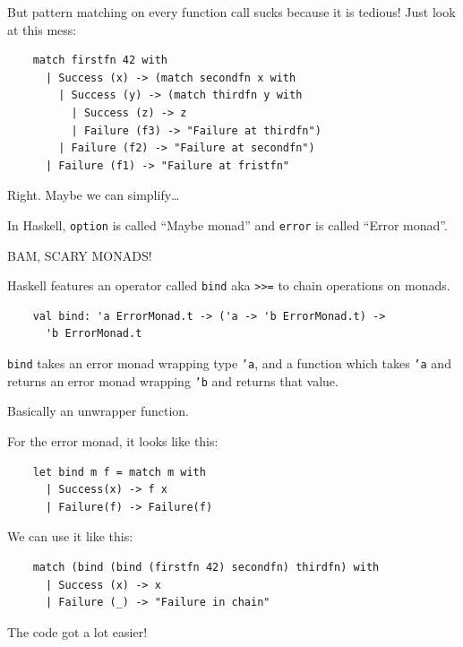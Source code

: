 \documentclass{beamer}
\renewcommand{\example}[1]{{\usebeamercolor[fg]{example text} #1}}
\begin{document}
\begin{frame}[fragile]
  But pattern matching on every function call sucks because it is
  \alert{tedious}! Just look at this mess:
  \begin{verbatim}
    match firstfn 42 with 
      | Success (x) -> (match secondfn x with
        | Success (y) -> (match thirdfn y with
          | Success (z) -> z
          | Failure (f3) -> "Failure at thirdfn")
        | Failure (f2) -> "Failure at secondfn")
      | Failure (f1) -> "Failure at fristfn"
  \end{verbatim}

  Right. Maybe we can \example{simplify}…

  In Haskell, \texttt{option} is called \enquote{Maybe monad} and 
  \texttt{error} is called \enquote{Error monad}.

  \pause
  \begin{center}
    {\Large \alert{BAM, SCARY MONADS!}}
  \end{center}
\end{frame}

\begin{frame}[fragile]
  Haskell features an operator called \texttt{bind} aka \texttt{>>=} to
  chain operations on monads.

  \begin{verbatim}
    val bind: 'a ErrorMonad.t -> ('a -> 'b ErrorMonad.t) ->
      'b ErrorMonad.t
  \end{verbatim}

  \texttt{bind} takes an error monad wrapping type \texttt{'a}, and a function
  which takes \texttt{'a} and returns an error monad wrapping
  \texttt{'b} and returns that value.

  Basically an unwrapper function.
\end{frame}

\begin{frame}[fragile]
  For the error monad, it looks like this:
  \begin{verbatim}
    let bind m f = match m with
      | Success(x) -> f x
      | Failure(f) -> Failure(f)
  \end{verbatim}

  We can use it like this:

  \begin{verbatim}
    match (bind (bind (firstfn 42) secondfn) thirdfn) with
      | Success (x) -> x
      | Failure (_) -> "Failure in chain"
  \end{verbatim}
  The code got a lot \example{easier}!
\end{frame}
\end{document}
